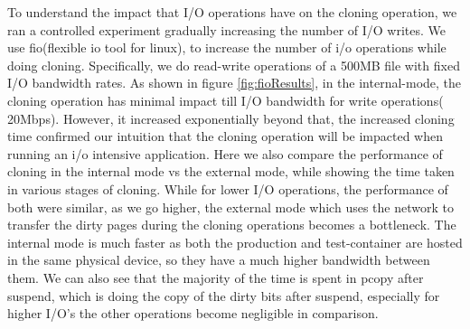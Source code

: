 To understand the impact that I/O operations have on the cloning operation, we ran a controlled experiment gradually increasing the number of I/O writes. 
We use fio(flexible io tool for linux)\cite{fio}, to increase the number of i/o operations while doing cloning. 
Specifically, we do read-write operations of a 500MB file with fixed I/O bandwidth rates.
As shown in figure \ref{fig:fioResults}, in the internal-mode, the cloning operation has minimal impact till I/O bandwidth for write operations(~ 20Mbps). 
However, it increased exponentially beyond that, the increased cloning time confirmed our intuition that the cloning operation will be impacted when running an i/o intensive application.
Here we also compare the performance of cloning in the internal mode vs the external mode, while showing the time taken in various stages of cloning.
While for lower I/O operations, the performance of both were similar, as we go higher, the external mode which uses the network to transfer the dirty pages during the cloning operations becomes a bottleneck. 
The internal mode is much faster as both the production and test-container are hosted in the same physical device, so they have a much higher bandwidth between them.
We can also see that the majority of the time is spent in pcopy after suspend, which is doing the copy of the dirty bits after suspend, especially for higher I/O's the other operations become negligible in comparison.

